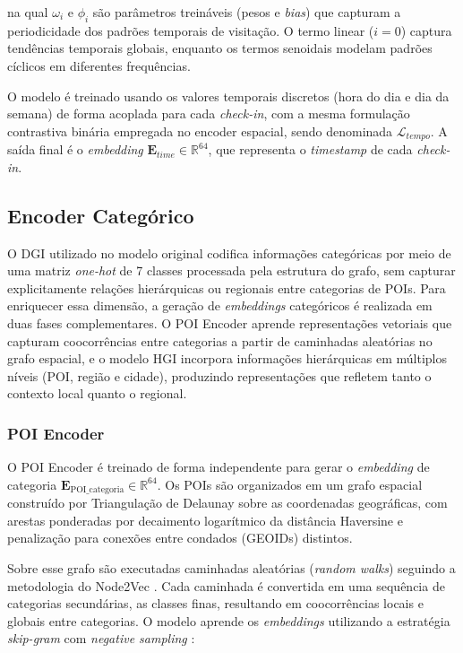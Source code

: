 na qual $\omega_i$ e $\phi_i$ são parâmetros treináveis (pesos e \textit{bias}) que capturam a periodicidade dos padrões temporais de visitação. O termo linear ($i=0$) captura tendências temporais globais, enquanto os termos senoidais modelam padrões cíclicos em diferentes frequências.

O modelo é treinado usando os valores temporais discretos (hora do dia e dia da semana) de forma acoplada para cada \textit{check-in}, com a mesma formulação contrastiva binária empregada no encoder espacial, sendo denominada $\mathcal{L}_{tempo}$. A saída final é o \textit{embedding} $\mathbf{E}_{time} \in \mathbb{R}^{64}$, que representa o \textit{timestamp} de cada \textit{check-in}.

\subsection{Encoder Categórico}

O DGI utilizado no modelo original codifica informações categóricas por meio de uma matriz \textit{one-hot} de 7 classes processada pela estrutura do grafo, sem capturar explicitamente relações hierárquicas ou regionais entre categorias de POIs. Para enriquecer essa dimensão, a geração de \textit{embeddings} categóricos é realizada em duas fases complementares. O POI Encoder aprende representações vetoriais que capturam coocorrências entre categorias a partir de caminhadas aleatórias no grafo espacial, e o modelo HGI \cite{huang2023learning} incorpora informações hierárquicas em múltiplos níveis (POI, região e cidade), produzindo representações que refletem tanto o contexto local quanto o regional.

\subsubsection{POI Encoder}

O POI Encoder é treinado de forma independente para gerar o \textit{embedding} de categoria $\mathbf{E}_{\text{POI\_categoria}} \in \mathbb{R}^{64}$. Os POIs são organizados em um grafo espacial construído por Triangulação de Delaunay sobre as coordenadas geográficas, com arestas ponderadas por decaimento logarítmico da distância Haversine e penalização para conexões entre condados (GEOIDs) distintos.

Sobre esse grafo são executadas caminhadas aleatórias (\textit{random walks}) seguindo a metodologia do Node2Vec \cite{grover2016node2vec}. Cada caminhada é convertida em uma sequência de categorias secundárias, as classes finas, resultando em coocorrências locais e globais entre categorias.
O modelo aprende os \textit{embeddings} utilizando a estratégia \textit{skip-gram} com \textit{negative sampling} \cite{church2017word2vec}:

